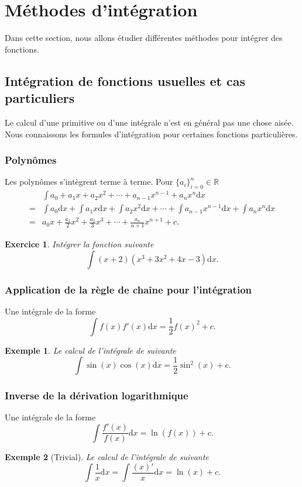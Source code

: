 \documentclass[a4paper,12pt]{book}
\newcommand{\real}{\mathbb{R}}
\newcommand{\dd}{\mathrm{d}}
\newtheorem*{exemple}{Exemple}
\newtheorem*{exercice}{Exercice}
\begin{document}
\section{Méthodes d'intégration}
Dans cette section, nous allons étudier différentes méthodes pour intégrer des fonctions.

\subsection{Intégration de fonctions usuelles et cas particuliers}
Le calcul d'une primitive ou d'une intégrale n'est en général pas une chose aisée. Nous connaissons les formules d'intégration
pour certaines fonctions particulières.
\subsubsection{Polynômes}
Les polynômes s'intègrent terme à terme. Pour $\{a_i\}_{i=0}^{n}\in\real$
\begin{align}
 &\int a_0 + a_1 x + a_2 x^2+\cdots+a_{n-1} x^{n-1}+a_{n} x^{n}\dd x\\
 =&\int a_0\dd x + \int a_1 x\dd x + \int a_2 x^2\dd x+\cdots+\int a_{n-1} x^{n-1}\dd x+\int a_{n} x^{n}\dd x\\
 =&a_0 x + \frac{a_1}{2}x^2+\frac{a_2}{3}x^3+\cdots+\frac{a_n}{n+1}x^{n+1}+c.
\end{align}
\begin{exercice}
 Intégrer la fonction suivante
 \begin{equation}
  \int (x+2)(x^3+3x^2+4x-3)\dd x.
 \end{equation}
\end{exercice}
\subsubsection{Application de la règle de chaîne pour l'intégration}
Une intégrale de la forme
\begin{equation}
 \int f(x)f'(x)\dd x=\frac{1}{2}f(x)^2+c.
\end{equation}
\begin{exemple}
 Le calcul de l'intégrale de suivante 
\begin{equation}
 \int \sin(x)\cos(x)\dd x=\frac{1}{2}\sin^2(x)+c.
\end{equation} 
\end{exemple}

\subsubsection{Inverse de la dérivation logarithmique}
Une intégrale de la forme
\begin{equation}
 \int \frac{f'(x)}{f(x)}\dd x=\ln(f(x))+c.
\end{equation}
\begin{exemple}[Trivial]
 Le calcul de l'intégrale de suivante 
\begin{equation}
 \int \frac{1}{x}\dd x=\int \frac{(x)'}{x}\dd x=\ln(x)+c.
\end{equation} 
\end{exemple}
\end{document}
